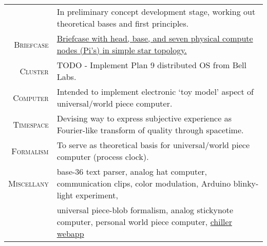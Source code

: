 \documentclass[letter,11pt]{article}
\begin{document}
\begin{center}
{\begin{tabular}{r|l}
	&	\scriptsize{In preliminary concept development stage, working out theoretical bases and first principles.}
	\\

\addlinespace[8pt]

		\textsc{Briefcase}
	&	\href{https://github.com/blairmunroakusa/portfolio.worksamples/tree/master/briefcaseCluster}{\scriptsize{Briefcase with head, base, and seven physical compute nodes (Pi's) in simple star topology.}}
	\\
		\textsc{Cluster}
	&	\scriptsize{TODO - Implement Plan 9 distributed OS from Bell Labs.}
	\\
		\textsc{Computer}
	&	\scriptsize{Intended to implement electronic `toy model' aspect of universal/world piece computer.}
	\\

\addlinespace[8pt]

		\textsc{Timespace}
	&	\scriptsize{Devising way to express subjective experience as Fourier-like transform of quality through spacetime.}
	\\
		\textsc{Formalism}
	&	\scriptsize{To serve as theoretical basis for universal/world piece computer (process clock).}
	\\

\addlinespace[8pt]

		\textsc{Miscellany}
	&	\scriptsize{base-36 text parser, analog hat computer, communication clips, color modulation, Arduino blinky-light experiment,}
	\\

	&	\scriptsize{universal piece-blob formalism, analog stickynote computer, personal world piece computer, \href{https://chiller.blairmunroakusa.wp.computer}{chiller webapp}}
	\\

\end{tabular}

}
\end{center}
\end{document}
